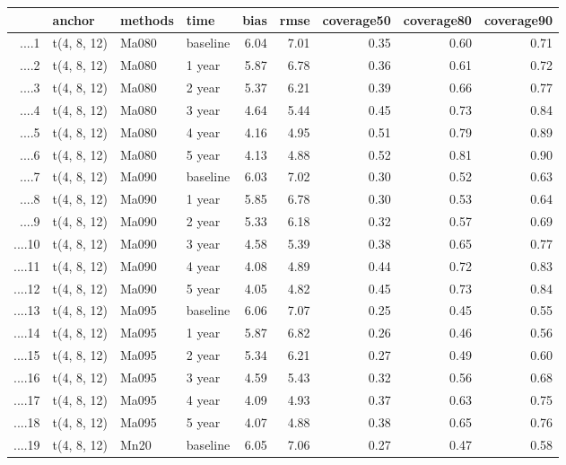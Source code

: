 \begin{table}[ht]
\centering
\begin{tabular}{rlllrrrrr}
  \hline
 & anchor & methods & time & bias & rmse & coverage50 & coverage80 & coverage90 \\ 
  \hline
....1 & t(4, 8, 12) & Ma080 & baseline & 6.04 & 7.01 & 0.35 & 0.60 & 0.71 \\ 
  ....2 & t(4, 8, 12) & Ma080 & 1 year & 5.87 & 6.78 & 0.36 & 0.61 & 0.72 \\ 
  ....3 & t(4, 8, 12) & Ma080 & 2 year & 5.37 & 6.21 & 0.39 & 0.66 & 0.77 \\ 
  ....4 & t(4, 8, 12) & Ma080 & 3 year & 4.64 & 5.44 & 0.45 & 0.73 & 0.84 \\ 
  ....5 & t(4, 8, 12) & Ma080 & 4 year & 4.16 & 4.95 & 0.51 & 0.79 & 0.89 \\ 
  ....6 & t(4, 8, 12) & Ma080 & 5 year & 4.13 & 4.88 & 0.52 & 0.81 & 0.90 \\ 
  ....7 & t(4, 8, 12) & Ma090 & baseline & 6.03 & 7.02 & 0.30 & 0.52 & 0.63 \\ 
  ....8 & t(4, 8, 12) & Ma090 & 1 year & 5.85 & 6.78 & 0.30 & 0.53 & 0.64 \\ 
  ....9 & t(4, 8, 12) & Ma090 & 2 year & 5.33 & 6.18 & 0.32 & 0.57 & 0.69 \\ 
  ....10 & t(4, 8, 12) & Ma090 & 3 year & 4.58 & 5.39 & 0.38 & 0.65 & 0.77 \\ 
  ....11 & t(4, 8, 12) & Ma090 & 4 year & 4.08 & 4.89 & 0.44 & 0.72 & 0.83 \\ 
  ....12 & t(4, 8, 12) & Ma090 & 5 year & 4.05 & 4.82 & 0.45 & 0.73 & 0.84 \\ 
  ....13 & t(4, 8, 12) & Ma095 & baseline & 6.06 & 7.07 & 0.25 & 0.45 & 0.55 \\ 
  ....14 & t(4, 8, 12) & Ma095 & 1 year & 5.87 & 6.82 & 0.26 & 0.46 & 0.56 \\ 
  ....15 & t(4, 8, 12) & Ma095 & 2 year & 5.34 & 6.21 & 0.27 & 0.49 & 0.60 \\ 
  ....16 & t(4, 8, 12) & Ma095 & 3 year & 4.59 & 5.43 & 0.32 & 0.56 & 0.68 \\ 
  ....17 & t(4, 8, 12) & Ma095 & 4 year & 4.09 & 4.93 & 0.37 & 0.63 & 0.75 \\ 
  ....18 & t(4, 8, 12) & Ma095 & 5 year & 4.07 & 4.88 & 0.38 & 0.65 & 0.76 \\ 
  ....19 & t(4, 8, 12) & Mn20 & baseline & 6.05 & 7.06 & 0.27 & 0.47 & 0.58 \\ 

\end{tabular}
\end{table}
